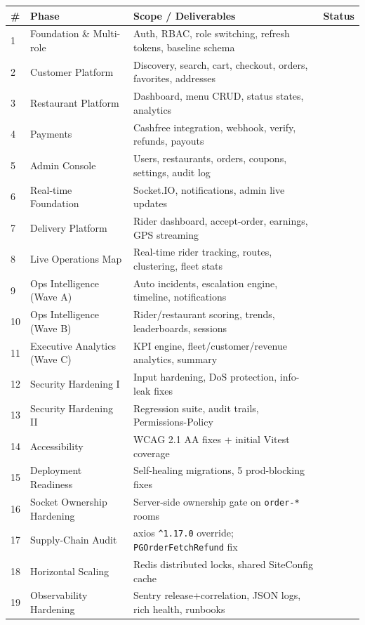 \documentclass[11pt,a4paper]{article}
\newcommand{\bcomplete}{\badge[ok]{COMPLETE}}
\newcommand{\th}[1]{\textbf{\color{white}#1}}
\begin{document}
\begin{center}\footnotesize
\begin{longtable}{p{0.5cm}p{4.2cm}p{6.5cm}p{2.6cm}}
\toprule
\rowcolor{headbg}\th{\#} & \th{Phase} & \th{Scope / Deliverables} & \th{Status} \\
\midrule
\endhead
1 & Foundation \& Multi-role & Auth, RBAC, role switching, refresh tokens, baseline schema & \bcomplete \\
\rowcolor{rowalt}2 & Customer Platform & Discovery, search, cart, checkout, orders, favorites, addresses & \bcomplete \\
3 & Restaurant Platform & Dashboard, menu CRUD, status states, analytics & \bcomplete \\
\rowcolor{rowalt}4 & Payments & Cashfree integration, webhook, verify, refunds, payouts & \bcomplete \\
5 & Admin Console & Users, restaurants, orders, coupons, settings, audit log & \bcomplete \\
\rowcolor{rowalt}6 & Real-time Foundation & Socket.IO, notifications, admin live updates & \bcomplete \\
7 & Delivery Platform & Rider dashboard, accept-order, earnings, GPS streaming & \bcomplete \\
\rowcolor{rowalt}8 & Live Operations Map & Real-time rider tracking, routes, clustering, fleet stats & \bcomplete \\
9 & Ops Intelligence (Wave A) & Auto incidents, escalation engine, timeline, notifications & \bcomplete \\
\rowcolor{rowalt}10 & Ops Intelligence (Wave B) & Rider/restaurant scoring, trends, leaderboards, sessions & \bcomplete \\
11 & Executive Analytics (Wave C) & KPI engine, fleet/customer/revenue analytics, summary & \bcomplete \\
\rowcolor{rowalt}12 & Security Hardening I & Input hardening, DoS protection, info-leak fixes & \bcomplete \\
13 & Security Hardening II & Regression suite, audit trails, Permissions-Policy & \bcomplete \\
\rowcolor{rowalt}14 & Accessibility & WCAG 2.1 AA fixes + initial Vitest coverage & \bcomplete \\
15 & Deployment Readiness & Self-healing migrations, 5 prod-blocking fixes & \bcomplete \\
\rowcolor{rowalt}16 & Socket Ownership Hardening & Server-side ownership gate on \texttt{order-*} rooms & \bcomplete \\
17 & Supply-Chain Audit & axios \texttt{\^{}1.17.0} override; \texttt{PGOrderFetchRefund} fix & \bcomplete \\
\rowcolor{rowalt}18 & Horizontal Scaling & Redis distributed locks, shared SiteConfig cache & \bcomplete \\
19 & Observability Hardening & Sentry release+correlation, JSON logs, rich health, runbooks & \bcomplete \\
\bottomrule
\end{longtable}
\end{center}
\end{document}
